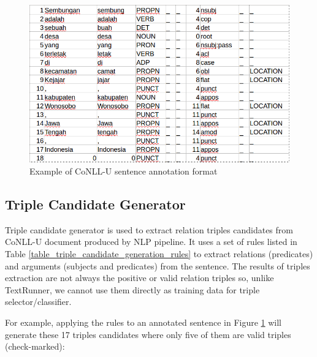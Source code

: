 \documentclass[conference,compsoc,12pt]{IEEEtran}
\begin{document}
\begin{figure}
\centering
\includegraphics[scale=0.35]{../images/conllu_example.png}
\caption{Example of CoNLL-U sentence annotation format}
\label{fig_conllu_example}
\end{figure}

\subsection{Triple Candidate Generator} \label{Triple Candidate Generator}


Triple candidate generator is used to extract relation triples candidates from CoNLL-U document produced by NLP pipeline. It uses a set of rules listed in Table \ref{table_triple_candidate_generation_rules} to extract relations (predicates) and arguments (subjects and predicates) from the sentence. The results of triples extraction are not always the positive or valid relation triples so, unlike TextRunner\cite{banko2007open}, we cannot use them directly as training data for triple selector/classifier.

For example, applying the rules to an annotated sentence in Figure \ref{fig_conllu_example} will generate these 17 triples candidates where only five of them are valid triples (check-marked):
\end{document}
